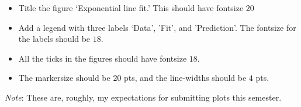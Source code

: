 \documentclass[answers,10pt]{exam}
\begin{document}
\begin{questions}
\begin{itemize}
\item Title the figure `Exponential line fit.' This should have fontsize $20$

\item Add a legend with three labels `Data', 'Fit', and 'Prediction'. The fontsize for the labels should be $18$. 

\item All the ticks in the figures should have fontsize $18$.

\item The markersize should be $20$ pts, and the line-widths should be $4$ pts. 

\end{itemize}

\textit{Note}: These are, roughly, my expectations for submitting plots this semester.



\end{questions}
\end{document}
